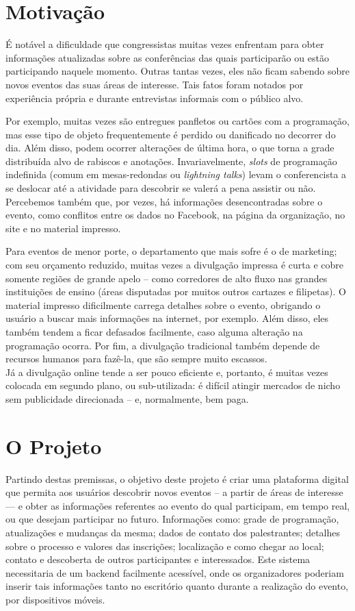 \documentclass[12pt,a4paper,twoside,hyphens,english,brazil]{abntex2}
\begin{document}
\section{Motivação}

É notável a dificuldade que congressistas muitas vezes enfrentam para obter informações atualizadas sobre as conferências das quais participarão ou estão participando naquele momento. Outras tantas vezes, eles não ficam sabendo sobre novos eventos das suas áreas de interesse. Tais fatos foram notados por experiência própria e durante entrevistas informais com o público alvo.

Por exemplo, muitas vezes são entregues panfletos ou cartões com a programação, mas esse tipo de objeto frequentemente é perdido ou danificado no decorrer do dia. Além disso, podem ocorrer alterações de última hora, o que torna a grade distribuída alvo de rabiscos e anotações. Invariavelmente, \emph{slots} de programação indefinida (comum em mesas-redondas ou \emph{lightning talks}\footnotemark) levam o conferencista a se deslocar até a atividade para descobrir se valerá a pena assistir ou não. Percebemos também que, por vezes, há informações desencontradas sobre o evento, como conflitos entre os dados no Facebook, na página da organização, no site e no material impresso.

Para eventos de menor porte, o departamento que mais sofre é o de marketing; com seu orçamento reduzido, muitas vezes a divulgação impressa é curta e cobre somente regiões de grande apelo -- como corredores de alto fluxo nas grandes instituições de ensino (áreas disputadas por muitos outros cartazes e filipetas). O material impresso dificilmente carrega detalhes sobre o evento, obrigando o usuário a buscar mais informações na internet, por exemplo. Além disso, eles também tendem a ficar defasados facilmente, caso alguma alteração na programação ocorra. Por fim, a divulgação tradicional também depende de recursos humanos para fazê-la, que são sempre muito escassos.\\
Já a divulgação online tende a ser pouco eficiente e, portanto, é muitas vezes colocada em segundo plano, ou sub-utilizada: é difícil atingir mercados de nicho sem publicidade direcionada -- e, normalmente, bem paga.

\section{O Projeto}

Partindo destas premissas, o objetivo deste projeto é criar uma plataforma digital que permita aos usuários descobrir novos eventos -- a partir de áreas de interesse --- e obter as informações referentes ao evento do qual participam, em tempo real, ou que desejam participar no futuro. Informações como: grade de programação, atualizações e mudanças da mesma; dados de contato dos palestrantes; detalhes sobre o processo e valores das inscrições; localização e como chegar ao local; contato e descoberta de outros participantes e interessados. Este sistema necessitaria de um backend facilmente acessível, onde os organizadores poderiam inserir tais informações tanto no escritório quanto durante a realização do evento, por dispositivos móveis.
\end{document}
